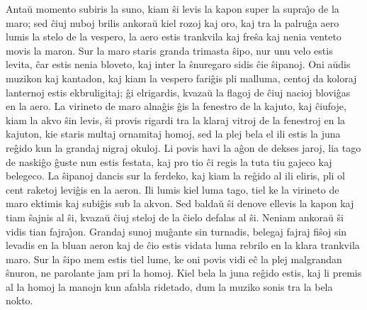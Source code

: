    Anta\u u momento subiris la suno, kiam \^si levis la kapon super la
supra\^{\j}o de la maro; sed \^ciuj nuboj brilis ankora\u u kiel
rozoj kaj oro, kaj tra la palru\^ga aero lumis la stelo de la
vespero, la aero estis trankvila kaj fre\^sa kaj nenia venteto movis
la maron. Sur la maro staris granda trimasta \^sipo, nur unu velo
estis levita, \^car estis nenia bloveto, kaj inter la \^snuregaro
sidis \^cie \^sipanoj. Oni a\u udis muzikon kaj kantadon, kaj kiam
la vespero fari\^gis pli malluma, centoj da koloraj lanternoj estis
ekbruligitaj; \^gi elrigardis, kvaza\u u la flagoj de \^ciuj nacioj
blovi\^gas en la aero. La virineto de maro alna\^gis \^gis la
fenestro de la kajuto, kaj \^ciufoje, kiam la akvo \^sin levis, \^si
provis rigardi tra la klaraj vitroj de la fenestroj en la kajuton,
kie staris multaj ornamitaj homoj, sed la plej bela el ili estis la
juna re\^gido kun la grandaj nigraj okuloj. Li povis havi la a\^gon
de dekses jaroj, lia tago de naski\^go \^guste nun estis festata,
kaj pro tio \^ci regis la tuta tiu gajeco kaj belegeco. La \^sipanoj
dancis sur la ferdeko, kaj kiam la re\^gido al ili eliris, pli ol
cent raketoj levi\^gis en la aeron. Ili lumis kiel luma tago, tiel
ke la virineto de maro ektimis kaj subi\^gis sub la akvon. Sed
balda\u u \^si denove ellevis la kapon kaj tiam \^sajnis al \^si,
kvaza\u u \^ciuj steloj de la \^cielo defalas al \^si. Neniam
ankora\u u \^si vidis tian fajra\^{\j}on. Grandaj sunoj mu\^gante
sin turnadis, belegaj fajraj fi\^soj sin levadis en la bluan aeron
kaj de \^cio estis vidata luma rebrilo en la klara trankvila maro.
Sur la \^sipo mem estis tiel lume, ke oni povis vidi e\^c la plej
malgrandan \^snuron, ne parolante jam pri la homoj. Kiel bela la
juna re\^gido estis, kaj li premis al la homoj la manojn kun afabla
ridetado, dum la muziko sonis tra la bela nokto.

